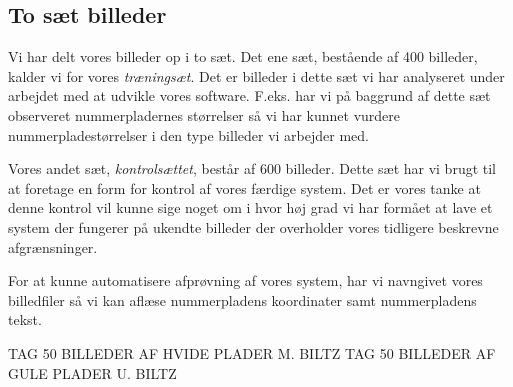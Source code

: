 \subsection{To sæt billeder}
Vi har delt vores billeder op i to sæt. Det ene sæt, bestående af 400 billeder, kalder vi for vores \textit{træningsæt}. Det er billeder i dette sæt vi har analyseret under arbejdet med at udvikle vores software. F.eks. har vi på baggrund af dette sæt observeret nummerpladernes størrelser så vi har kunnet vurdere nummerpladestørrelser i den type billeder vi arbejder med.

Vores andet sæt, \textit{kontrolsættet}, består af 600 billeder. Dette sæt har vi brugt til at foretage en form for kontrol af vores færdige system. Det er vores tanke at denne kontrol vil kunne sige noget om i hvor høj grad vi har formået at lave et system der fungerer på ukendte billeder der overholder vores  tidligere beskrevne afgrænsninger. 

For at kunne automatisere afprøvning af vores system, har vi navngivet vores billedfiler så vi kan aflæse nummerpladens koordinater samt nummerpladens tekst. 

TAG 50 BILLEDER AF HVIDE PLADER M. BILTZ
TAG 50 BILLEDER AF GULE PLADER U. BILTZ



